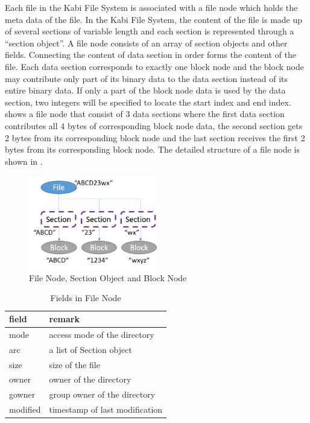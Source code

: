    Each file in the Kabi File System is associated with a file node which holds the meta data of the file. In the Kabi File System, the content of the file is made up of several sections of variable length and each section is represented through a ``section object''. A file node consists of an array of section objects and other fields. Connecting the content of data section in order forms the content of the file. Each data section corresponds to exactly one block node and the block node may contribute only part of its binary data to the data section instead of its entire binary data. If only a part of the block node data is used by the data section, two integers will be specified to locate the start index and end index.  shows a file node that consist of 3 data sections where the first data section contributes all 4 bytes of corresponding block node data, the second section gets 2 bytes from its corresponding block node and the last section receives the first 2 bytes from its corresponding block node. The detailed structure of a file node is shown in .

\begin{figure}[hbtp]
\centering
\includegraphics[width=0.5\textwidth]{Chapter-3/figs/fig7.png}
\caption{File Node, Section Object and Block Node}
\label{fig:file_and_section}
\end{figure}


\begin{table}
\caption{Fields in File Node}
\label{tab:file_fields}
\begin{center}
\begin{tabular}{ll}
\toprule
field & remark\\
\midrule
mode & access mode of the directory\\
arc & a list of Section object\\
size & size of the file\\
owner & owner of the directory\\
gowner & group owner of the directory\\
modified & timestamp of last modification\\
\bottomrule
\end{tabular}
\end{center}
\end{table}

